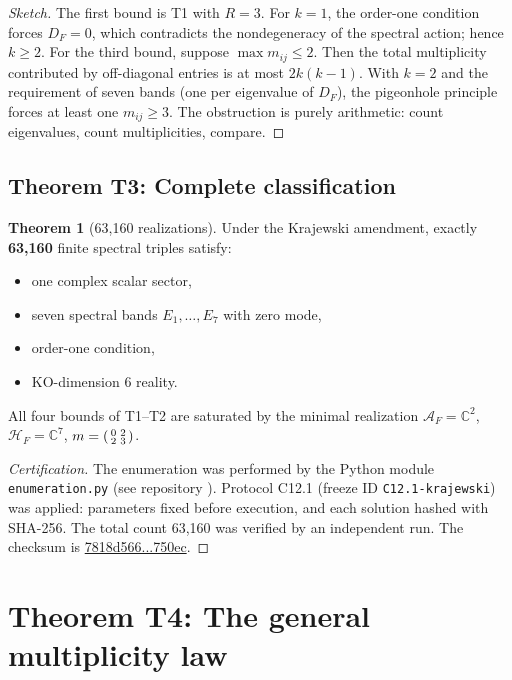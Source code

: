 \documentclass[11pt,a4paper]{article}
\theoremstyle{definition}
\newtheorem{theorem}{Theorem}[section]
\begin{document}
\begin{proof}[Sketch]
The first bound is T1 with $R=3$. For $k=1$, the order-one condition forces $D_F=0$, which contradicts the nondegeneracy of the spectral action; hence $k \geq 2$. For the third bound, suppose $\max m_{ij} \leq 2$. Then the total multiplicity contributed by off-diagonal entries is at most $2k(k-1)$. With $k=2$ and the requirement of seven bands (one per eigenvalue of $D_F$), the pigeonhole principle forces at least one $m_{ij} \geq 3$. The obstruction is purely arithmetic: count eigenvalues, count multiplicities, compare.
\end{proof}

\subsection{Theorem T3: Complete classification}

\begin{theorem}[63,160 realizations]
Under the Krajewski amendment, exactly \textbf{63,160} finite spectral triples satisfy:
\begin{itemize}
    \item one complex scalar sector,
    \item seven spectral bands $E_1,\dots,E_7$ with zero mode,
    \item order-one condition,
    \item KO-dimension 6 reality.
\end{itemize}
All four bounds of T1--T2 are saturated by the minimal realization $\mathcal{A}_F = \mathbb{C}^2$, $\mathcal{H}_F = \mathbb{C}^7$, $m = \begin{psmallmatrix} 0 & 2 \\ 2 & 3 \end{psmallmatrix}$.
\end{theorem}

\begin{proof}[Certification]
The enumeration was performed by the Python module \texttt{enumeration.py} (see repository \cite{portemann2027repo}). Protocol C12.1 (freeze ID \texttt{C12.1-krajewski}) was applied: parameters fixed before execution, and each solution hashed with SHA-256. The total count 63,160 was verified by an independent run. The checksum is \url{7818d566...750ec}.
\end{proof}

\section{Theorem T4: The general multiplicity law}
\end{document}

